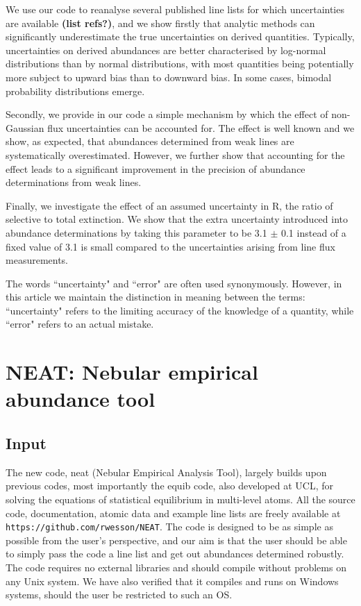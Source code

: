 \documentclass[useAMS,usenatbib]{mn2e}
\begin{document}
We use our code to reanalyse several published line lists for which uncertainties are available \textbf{(list refs?)}, and we show firstly that analytic methods can significantly underestimate the true uncertainties on derived quantities.  Typically, uncertainties on derived abundances are better characterised by log-normal distributions than by normal distributions, with most quantities being potentially more subject to upward bias than to downward bias.  In some cases, bimodal probability distributions emerge.

Secondly, we provide in our code a simple mechanism by which the effect of non-Gaussian flux uncertainties can be accounted for.  The effect is well known and we show, as expected, that abundances determined from weak lines are systematically overestimated.  However, we further show that accounting for the effect leads to a significant improvement in the precision of abundance determinations from weak lines.

Finally, we investigate the effect of an assumed uncertainty in R, the ratio of selective to total extinction.  We show that the extra uncertainty introduced into abundance determinations by taking this parameter to be 3.1 $\pm$ 0.1 instead of a fixed value of 3.1 is small compared to the uncertainties arising from line flux measurements.

The words ``uncertainty" and ``error" are often used synonymously.  However, in this article we maintain the distinction in meaning between the terms: ``uncertainty" refers to the limiting accuracy of the knowledge of a quantity, while ``error" refers to an actual mistake.

\section{NEAT: Nebular empirical abundance tool}

\subsection{Input}

The new code, {\sc neat} (Nebular Empirical Analysis Tool), largely builds upon previous codes, most importantly the {\sc equib} code, also developed at UCL, for solving the equations of statistical equilibrium in multi-level atoms.  All the source code, documentation, atomic data and example line lists are freely available at \texttt{https://github.com/rwesson/NEAT}.  The code is designed to be as simple as possible from the user's perspective, and our aim is that the user should be able to simply pass the code a line list and get out abundances determined robustly.  The code requires no external libraries and should compile without problems on any Unix system.  We have also verified that it compiles and runs on Windows systems, should the user be restricted to such an OS.
\end{document}
